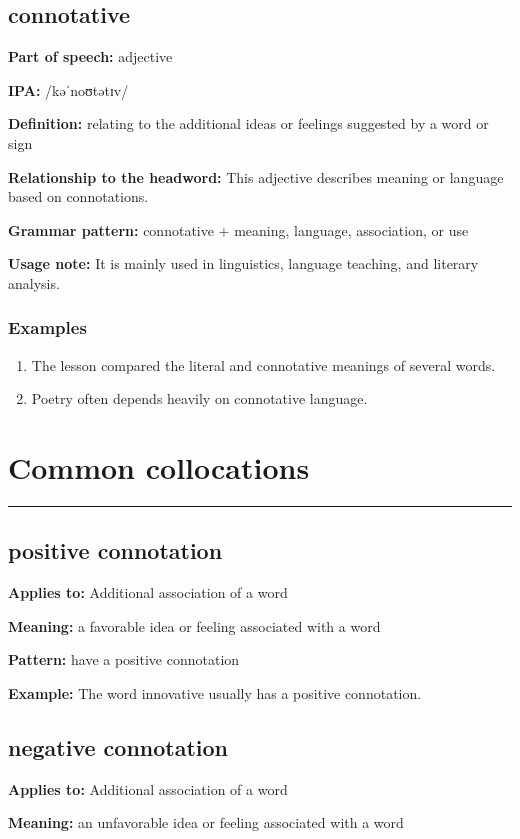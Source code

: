 \documentclass[11pt]{article}
\newcommand{\sectionrule}{\par\vspace{-0.5em}\noindent\textcolor{Accent}{\rule{\linewidth}{0.6pt}}\par}
\begin{document}
\subsection{connotative}
\textbf{Part of speech:} adjective

\textbf{IPA:} /kəˈnoʊtətɪv/

\textbf{Definition:} relating to the additional ideas or feelings suggested by a word or sign

\textbf{Relationship to the headword:} This adjective describes meaning or language based on connotations.

\textbf{Grammar pattern:} connotative + meaning, language, association, or use

\textbf{Usage note:} It is mainly used in linguistics, language teaching, and literary analysis.

\subsubsection{Examples}
\begin{enumerate}
  \item The lesson compared the literal and connotative meanings of several words.
  \item Poetry often depends heavily on connotative language.
\end{enumerate}

\section{Common collocations}
\sectionrule
\subsection{positive connotation}
\textbf{Applies to:} Additional association of a word

\textbf{Meaning:} a favorable idea or feeling associated with a word

\textbf{Pattern:} have a positive connotation

\textbf{Example:} The word innovative usually has a positive connotation.

\subsection{negative connotation}
\textbf{Applies to:} Additional association of a word

\textbf{Meaning:} an unfavorable idea or feeling associated with a word
\end{document}
